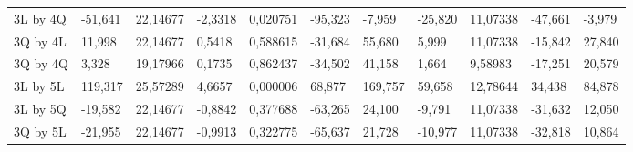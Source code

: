 \begin{table}[H]
{\begin{tabular}{lllllllllll}
\rowcolor[HTML]{FFFFFF} 
3L by 4Q                              & {\color[HTML]{FF0000} -51,641}  & {\color[HTML]{FF0000} 22,14677} & {\color[HTML]{FF0000} -2,3318}  & {\color[HTML]{FF0000} 0,020751} & {\color[HTML]{FF0000} -95,323}        & {\color[HTML]{FF0000} -7,959}         & {\color[HTML]{FF0000} -25,820}  & {\color[HTML]{FF0000} 11,07338}      & {\color[HTML]{FF0000} -47,661}        & {\color[HTML]{FF0000} -3,979}         \\
\rowcolor[HTML]{FFFFFF} 
3Q by 4L                              & 11,998                          & 22,14677                        & 0,5418                          & 0,588615                        & -31,684                               & 55,680                                & 5,999                           & 11,07338                             & -15,842                               & 27,840                                \\
\rowcolor[HTML]{FFFFFF} 
3Q by 4Q                              & 3,328                           & 19,17966                        & 0,1735                          & 0,862437                        & -34,502                               & 41,158                                & 1,664                           & 9,58983                              & -17,251                               & 20,579                                \\
\rowcolor[HTML]{FFFFFF} 
3L by 5L                              & {\color[HTML]{FF0000} 119,317}  & {\color[HTML]{FF0000} 25,57289} & {\color[HTML]{FF0000} 4,6657}   & {\color[HTML]{FF0000} 0,000006} & {\color[HTML]{FF0000} 68,877}         & {\color[HTML]{FF0000} 169,757}        & {\color[HTML]{FF0000} 59,658}   & {\color[HTML]{FF0000} 12,78644}      & {\color[HTML]{FF0000} 34,438}         & {\color[HTML]{FF0000} 84,878}         \\
\rowcolor[HTML]{FFFFFF} 
3L by 5Q                              & -19,582                         & 22,14677                        & -0,8842                         & 0,377688                        & -63,265                               & 24,100                                & -9,791                          & 11,07338                             & -31,632                               & 12,050                                \\
\rowcolor[HTML]{FFFFFF} 
3Q by 5L                              & -21,955                         & 22,14677                        & -0,9913                         & 0,322775                        & -65,637                               & 21,728                                & -10,977                         & 11,07338                             & -32,818                               & 10,864                                \\

\end{tabular}}
\end{table}
